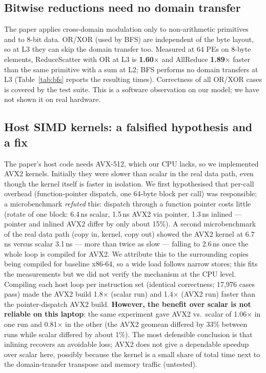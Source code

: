 \documentclass[conference]{IEEEtran}
\begin{document}
\subsection{Bitwise reductions need no domain transfer}\label{sec:or}
The paper applies cross-domain modulation only to non-arithmetic primitives and to 8-bit data. OR/XOR (used by BFS) are independent of the byte layout, so at L3 they can skip the domain transfer too. Measured at 64 PEs on 8-byte elements, ReduceScatter with OR at L3 is \textbf{1.60$\times$} and AllReduce \textbf{1.89$\times$} faster than the same primitive with a sum at L2; BFS performs no domain transfers at L3 (Table~\ref{tab:bfs} reports the resulting times). Correctness of all OR/XOR cases is covered by the test suite. This is a software observation on our model; we have not shown it on real hardware.

\subsection{Host SIMD kernels: a falsified hypothesis and a fix}
The paper's host code needs AVX-512, which our CPU lacks, so we implemented AVX2 kernels. Initially they were slower than scalar in the real data path, even though the kernel itself is faster in isolation. We first hypothesised that per-call overhead (function-pointer dispatch, one 64-byte block per call) was responsible; a microbenchmark \emph{refuted} this: dispatch through a function pointer costs little (rotate of one block: 6.4\,ns scalar, 1.5\,ns AVX2 via pointer, 1.3\,ns inlined --- pointer and inlined AVX2 differ by only about 15\%). A second microbenchmark of the real data path (copy in, kernel, copy out) showed the AVX2 kernel at 6.7\,ns versus scalar 3.1\,ns --- more than twice as slow --- falling to 2.6\,ns once the whole loop is compiled for AVX2. We attribute this to the surrounding copies being compiled for baseline x86-64, so a wide load follows narrow stores; this fits the measurements but we did not verify the mechanism at the CPU level. Compiling each host loop per instruction set (identical correctness; 17,976 cases pass) made the AVX2 build 1.8$\times$ (scalar run) and 1.4$\times$ (AVX2 run) faster than the pointer-dispatch AVX2 build. \textbf{However, the benefit over scalar is not reliable on this laptop}: the same experiment gave AVX2 vs.\ scalar of 1.06$\times$ in one run and 0.81$\times$ in the other (the AVX2 geomean differed by 33\% between runs while scalar differed by about 1\%). The most defensible conclusion is that inlining recovers an avoidable loss; AVX2 does not give a dependable speedup over scalar here, possibly because the kernel is a small share of total time next to the domain-transfer transpose and memory traffic (untested).
\end{document}

